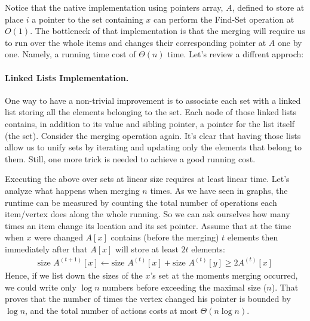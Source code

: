 Notice that the native implementation using pointers array, $A$, defined to store at place $i$ a pointer to the set containing $x$ can perform the Find-Set operation at $O\left( 1 \right)$. The bottleneck of that implementation is that the merging will require us to run over the whole items and changes their corresponding pointer at $A$ one by one. Namely, a running time cost of $\Theta\left( n \right)$ time. Let's review a diffrent approch:

\paragraph{Linked Lists Implementation.}
One way to have a non-trivial improvement is to associate each set with a linked list storing all the elements belonging to the set. Each node of those linked lists contains, in addition to its value and sibling pointer, a pointer for the list itself (the set). Consider the merging operation again. It's clear that having those lists allow us to unify sets by iterating and updating only the elements that belong to them. Still, one more trick is needed to achieve a good running cost. 



  \begin{algorithm}[H]
  \end{algorithm}


Executing the above over sets at linear size requires at least linear time. Let's analyze what happens when merging $n$ times. As we have seen in graphs, the runtime can be measured by counting the total number of operations each item/vertex does along the whole running. So we can ask ourselves how many times an item change its location and its set pointer. Assume that at the time when $x$ were changed $A[x]$ contains (before the merging) $t$ elements then immediately after that $A[x]$ will store at least $2t$ elements: 
\begin{equation*}
  \begin{split}
    \text{size } A^{(t+1)}[x] \leftarrow  \text{size } A^{(t)}[x] +  \text{size } A^{(t)}[y] \ge 2A^{(t)}[x]  
  \end{split}
\end{equation*}
Hence, if we list down the sizes of the $x$'s set at the moments merging occurred, we could write only $\log n$ numbers before exceeding the maximal size ($n$). That proves that the number of times the vertex changed his pointer is bounded by $\log n$, and the total number of actions costs at most $\Theta\left( n\log n \right)$. 

